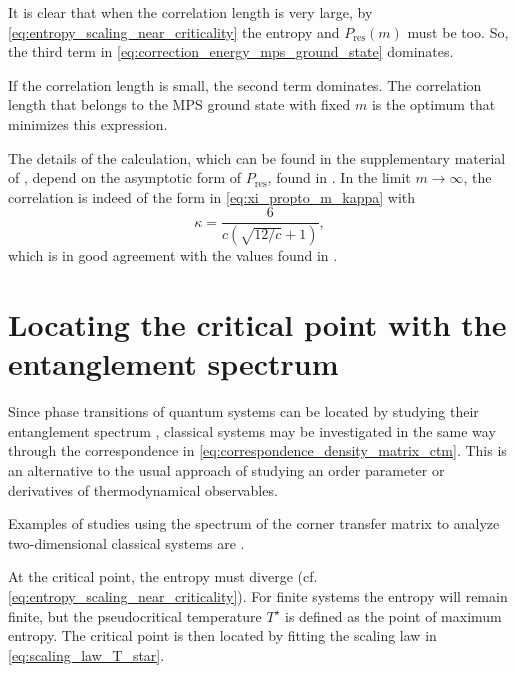 It is clear that when the correlation length is very large, by \autoref{eq:entropy_scaling_near_criticality} the entropy
and $P_{\text{res}}(m)$ must be too.
So, the third term in \autoref{eq:correction_energy_mps_ground_state} dominates.

If the correlation length is small, the second term dominates.
The correlation length that belongs to the MPS ground state with fixed $m$ is the optimum that minimizes this
expression.

The details of the calculation, which can be found in the supplementary material of \cite{pollmann2009theory},
depend on the asymptotic form of $P_{\text{res}}$, found in \cite{calabrese2008entanglement}. In the limit $m \to \infty$, the correlation is indeed of the form in \autoref{eq:xi_propto_m_kappa} with
\begin{equation}\label{eq:exact_value_kappa}
  \kappa = \frac{6}{c \left( \sqrt{12/c} + 1 \right) },
\end{equation}
which is in good agreement with the values found in \cite{tagliacozzo2008scaling}.

\section{Locating the critical point with the entanglement spectrum}\label{sec:locating_critical_point_entanglement}
Since phase transitions of quantum systems can be located by studying their entanglement spectrum
\cite{huang2017holographic, osborne2002entanglement}, classical systems may be investigated in the same way through the
correspondence in \autoref{eq:correspondence_density_matrix_ctm}.
This is an alternative to the usual approach of studying an order parameter or derivatives of thermodynamical
observables.

Examples of studies using the spectrum of the corner transfer matrix to analyze two-dimensional classical systems are
\cite{krvcmar2015reentrant, PhysRevE.94.022134, krvcmar2016phase}.

At the critical point, the entropy must diverge (cf.
\autoref{eq:entropy_scaling_near_criticality}).
For finite systems the entropy will remain finite, but the pseudocritical temperature $T^{\star}$ is defined as the
point of maximum entropy.
The critical point is then located by fitting the scaling law in \autoref{eq:scaling_law_T_star}.
